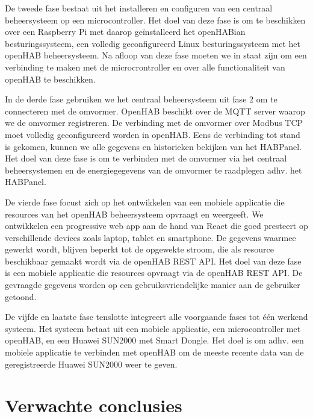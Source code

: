\documentclass{hogent-article}
\begin{document}
    De tweede fase bestaat uit het installeren en configuren van een centraal beheersysteem op een microcontroller. Het doel van deze fase is om te beschikken over een Raspberry Pi met daarop geïnstalleerd het openHABian besturingssysteem, een volledig geconfigureerd Linux besturingssysteem met het openHAB beheersysteem. Na afloop van deze fase moeten we in staat zijn om een verbinding te maken met de microcrontroller en over alle functionaliteit van openHAB te beschikken.
    
    In de derde fase gebruiken we het centraal beheersysteem uit fase 2 om te connecteren met de omvormer. OpenHAB beschikt over de MQTT server waarop we de omvormer registreren. De verbinding met de omvormer over Modbus TCP moet volledig geconfigureerd worden in openHAB. Eens de verbinding tot stand is gekomen, kunnen we alle gegevens en historieken bekijken van het HABPanel. Het doel van deze fase is om te verbinden met de omvormer via het centraal beheersystemen en de energiegegevens van de omvormer te raadplegen adhv. het HABPanel.
    
    De vierde fase focust zich op het ontwikkelen van een mobiele applicatie die resources van het openHAB beheersysteem opvraagt en weergeeft. We ontwikkelen een progressive web app aan de hand van React die goed presteert op verschillende devices zoals laptop, tablet en smartphone. De gegevens waarmee gewerkt wordt, blijven beperkt tot de opgewekte stroom, die als resource beschikbaar gemaakt wordt via de openHAB REST API. Het doel van deze fase is een mobiele applicatie die resources opvraagt via de openHAB REST API. De gevraagde gegevens worden op een gebruiksvriendelijke manier aan de gebruiker getoond.
    
    De vijfde en laatste fase tenslotte integreert alle voorgaande fases tot één werkend systeem. Het systeem betaat uit een mobiele applicatie, een microcontroller met openHAB, en een Huawei SUN2000 met Smart Dongle. Het doel is om adhv. een mobiele applicatie te verbinden met openHAB om de meeste recente data van de geregistreerde Huawei SUN2000 weer te geven.
    
    \section{Verwachte conclusies}
    
    
\end{document}
